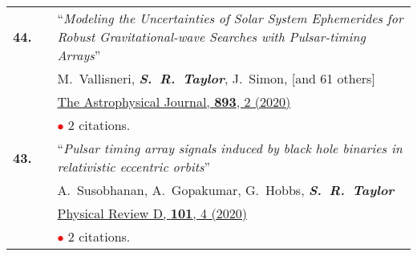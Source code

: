 \documentclass[11pt,letterpaper,sans]{moderncv}
\begin{document}
{\begin{longtable}{rp{0.3cm}p{15.8cm}}
\textbf{44.} & & ``\textit{Modeling the Uncertainties of Solar System Ephemerides for Robust Gravitational-wave Searches with Pulsar-timing Arrays}'' \\ 
&&M.~Vallisneri, \textit{\textbf{S.~R.~Taylor}}, J.~Simon, [and 61 others] \\
&& \href{https://ui.adsabs.harvard.edu/link_gateway/2020ApJ...893..112V/PUB_HTML}{{\color{color1} The Astrophysical Journal, \textbf{893}, 2 (2020)}} \\
&& \textcolor{red}{$\bullet$} $2$ citations. \vspace{0.09cm}\\
\textbf{43.} & & ``\textit{Pulsar timing array signals induced by black hole binaries in relativistic eccentric orbits}'' \\ 
&&A.~Susobhanan, A.~Gopakumar, G.~Hobbs, \textit{\textbf{S.~R.~Taylor}}\\
&& \href{https://ui.adsabs.harvard.edu/link_gateway/2020PhRvD.101d3022S/PUB_HTML}{{\color{color1} Physical Review D, \textbf{101}, 4 (2020)}} \\
&& \textcolor{red}{$\bullet$} $2$ citations. \vspace{0.09cm}\\

\end{longtable}}
\end{document}
